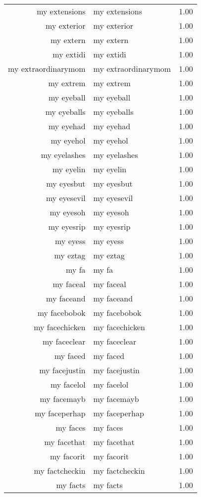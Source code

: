 \begin{table}[ht]
\begin{tabular}{rlr}
  my extensions & my extensions & 1.00 \\ 
  my exterior & my exterior & 1.00 \\ 
  my extern & my extern & 1.00 \\ 
  my extidi & my extidi & 1.00 \\ 
  my extraordinarymom & my extraordinarymom & 1.00 \\ 
  my extrem & my extrem & 1.00 \\ 
  my eyeball & my eyeball & 1.00 \\ 
  my eyeballs & my eyeballs & 1.00 \\ 
  my eyehad & my eyehad & 1.00 \\ 
  my eyehol & my eyehol & 1.00 \\ 
  my eyelashes & my eyelashes & 1.00 \\ 
  my eyelin & my eyelin & 1.00 \\ 
  my eyesbut & my eyesbut & 1.00 \\ 
  my eyesevil & my eyesevil & 1.00 \\ 
  my eyesoh & my eyesoh & 1.00 \\ 
  my eyesrip & my eyesrip & 1.00 \\ 
  my eyess & my eyess & 1.00 \\ 
  my eztag & my eztag & 1.00 \\ 
  my fa & my fa & 1.00 \\ 
  my faceal & my faceal & 1.00 \\ 
  my faceand & my faceand & 1.00 \\ 
  my facebobok & my facebobok & 1.00 \\ 
  my facechicken & my facechicken & 1.00 \\ 
  my faceclear & my faceclear & 1.00 \\ 
  my faced & my faced & 1.00 \\ 
  my facejustin & my facejustin & 1.00 \\ 
  my facelol & my facelol & 1.00 \\ 
  my facemayb & my facemayb & 1.00 \\ 
  my faceperhap & my faceperhap & 1.00 \\ 
  my faces & my faces & 1.00 \\ 
  my facethat & my facethat & 1.00 \\ 
  my facorit & my facorit & 1.00 \\ 
  my factcheckin & my factcheckin & 1.00 \\ 
  my facts & my facts & 1.00 \\ 

\end{tabular}
\end{table}
